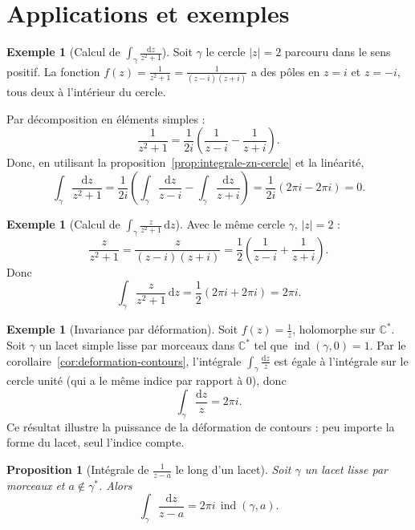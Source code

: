 \documentclass[12pt,a4paper,openany]{book}
\theoremstyle{definition}
\newtheorem{exemple}[definition]{Exemple}
\theoremstyle{plain}
\newtheorem{proposition}[definition]{Proposition}
\theoremstyle{remark}
\newcommand{\C}{\mathbb{C}}
\DeclareMathOperator{\ind}{ind}
\newcommand{\dd}{\mathrm{d}}
\newcommand{\abs}[1]{\left|#1\right|}
\begin{document}
\section{Applications et exemples}\label{sec:applications-integration}

\begin{exemple}[Calcul de $\displaystyle\int_\gamma \frac{\dd z}{z^2+1}$]\label{ex:calcul-z2+1}
Soit $\gamma$ le cercle $\abs{z} = 2$ parcouru dans le sens positif. La
fonction $f(z) = \frac{1}{z^2+1} = \frac{1}{(z-i)(z+i)}$ a des pôles en
$z = i$ et $z = -i$, tous deux à l'intérieur du cercle.

Par décomposition en éléments simples :
\[
  \frac{1}{z^2+1} = \frac{1}{2i}\left(\frac{1}{z-i} - \frac{1}{z+i}\right).
\]
Donc, en utilisant la proposition~\ref{prop:integrale-zn-cercle} et la
linéarité,
\[
  \int_\gamma \frac{\dd z}{z^2+1}
  = \frac{1}{2i}\left(\int_\gamma \frac{\dd z}{z-i}
    - \int_\gamma \frac{\dd z}{z+i}\right)
  = \frac{1}{2i}(2\pi i - 2\pi i) = 0.
\]
\end{exemple}

\begin{exemple}[Calcul de $\displaystyle\int_\gamma \frac{z}{z^2+1}\,\dd z$]\label{ex:calcul-z-sur-z2+1}
Avec le même cercle $\gamma$, $\abs{z} = 2$ :
\[
  \frac{z}{z^2+1} = \frac{z}{(z-i)(z+i)}
  = \frac{1}{2}\left(\frac{1}{z-i} + \frac{1}{z+i}\right).
\]
Donc
\[
  \int_\gamma \frac{z}{z^2+1}\,\dd z
  = \frac{1}{2}(2\pi i + 2\pi i) = 2\pi i.
\]
\end{exemple}

\begin{exemple}[Invariance par déformation]\label{ex:deformation}
Soit $f(z) = \frac{1}{z}$, holomorphe sur $\C^*$. Soit $\gamma$ un lacet
simple lisse par morceaux dans $\C^*$ tel que $\ind(\gamma, 0) = 1$.
Par le corollaire~\ref{cor:deformation-contours}, l'intégrale
$\int_\gamma \frac{\dd z}{z}$ est égale à l'intégrale sur le cercle unité
(qui a le même indice par rapport à $0$), donc
\[
  \int_\gamma \frac{\dd z}{z} = 2\pi i.
\]
Ce résultat illustre la puissance de la déformation de contours : peu importe
la forme du lacet, seul l'indice compte.
\end{exemple}

\begin{proposition}[Intégrale de $\frac{1}{z-a}$ le long d'un lacet]\label{prop:integrale-1-sur-z-a}
Soit $\gamma$ un lacet lisse par morceaux et $a \notin \gamma^*$. Alors
\[
  \int_\gamma \frac{\dd z}{z - a} = 2\pi i \, \ind(\gamma, a).
\]
\end{proposition}
\end{document}
